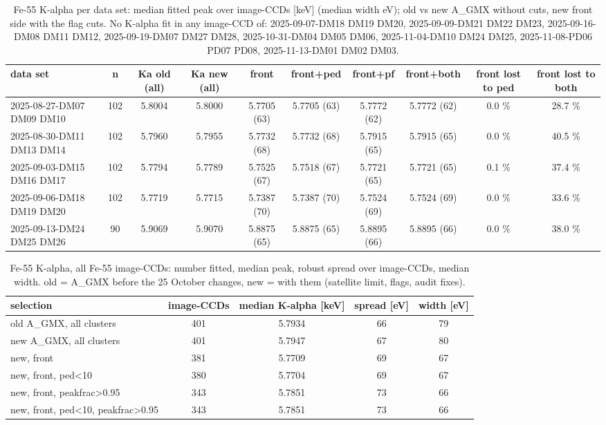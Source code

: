 \begin{table}[H]\centering\footnotesize
\begin{adjustbox}{max width=\linewidth}
\begin{tabular}{lccccccccc}
\toprule
data set & n & Ka old (all) & Ka new (all) & front & front+ped & front+pf & front+both & front lost to ped & front lost to both \\
\midrule
2025-08-27-DM07 DM09 DM10 & 102 & 5.8004 & 5.8000 & 5.7705 (63) & 5.7705 (63) & 5.7772 (62) & 5.7772 (62) & 0.0 \% & 28.7 \% \\
2025-08-30-DM11 DM13 DM14 & 102 & 5.7960 & 5.7955 & 5.7732 (68) & 5.7732 (68) & 5.7915 (65) & 5.7915 (65) & 0.0 \% & 40.5 \% \\
2025-09-03-DM15 DM16 DM17 & 102 & 5.7794 & 5.7789 & 5.7525 (67) & 5.7518 (67) & 5.7721 (65) & 5.7721 (65) & 0.1 \% & 37.4 \% \\
2025-09-06-DM18 DM19 DM20 & 102 & 5.7719 & 5.7715 & 5.7387 (70) & 5.7387 (70) & 5.7524 (69) & 5.7524 (69) & 0.0 \% & 33.6 \% \\
2025-09-13-DM24 DM25 DM26 & 90 & 5.9069 & 5.9070 & 5.8875 (65) & 5.8875 (65) & 5.8895 (66) & 5.8895 (66) & 0.0 \% & 38.0 \% \\
\bottomrule
\end{tabular}
\end{adjustbox}
\caption*{Fe-55 K-alpha per data set: median fitted peak over image-CCDs [keV] (median width eV); old vs new A\_GMX without cuts, new front side with the flag cuts. No K-alpha fit in any image-CCD of: 2025-09-07-DM18 DM19 DM20, 2025-09-09-DM21 DM22 DM23, 2025-09-16-DM08 DM11 DM12, 2025-09-19-DM07 DM27 DM28, 2025-10-31-DM04 DM05 DM06, 2025-11-04-DM10 DM24 DM25, 2025-11-08-PD06 PD07 PD08, 2025-11-13-DM01 DM02 DM03.}
\end{table}

\begin{table}[H]\centering\footnotesize
\begin{adjustbox}{max width=\linewidth}
\begin{tabular}{lcccc}
\toprule
selection & image-CCDs & median K-alpha [keV] & spread [eV] & width [eV] \\
\midrule
old A\_GMX, all clusters & 401 & 5.7934 & 66 & 79 \\
new A\_GMX, all clusters & 401 & 5.7947 & 67 & 80 \\
new, front & 381 & 5.7709 & 69 & 67 \\
new, front, ped<10 & 380 & 5.7704 & 69 & 67 \\
new, front, peakfrac>0.95 & 343 & 5.7851 & 73 & 66 \\
new, front, ped<10, peakfrac>0.95 & 343 & 5.7851 & 73 & 66 \\
\bottomrule
\end{tabular}
\end{adjustbox}
\caption*{Fe-55 K-alpha, all Fe-55 image-CCDs: number fitted, median peak, robust spread over image-CCDs, median width. old = A\_GMX before the 25 October changes, new = with them (satellite limit, flags, audit fixes).}
\end{table}

